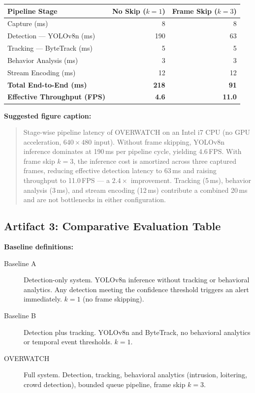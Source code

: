 \documentclass[11pt]{article}
\begin{document}
\begin{center}
\begin{tabular}{lrr}
\toprule
Pipeline Stage & No Skip ($k{=}1$) & Frame Skip ($k{=}3$) \\
\midrule
Capture (ms) & 8 & 8 \\
Detection --- YOLOv8n (ms) & 190 & 63 \\
Tracking --- ByteTrack (ms) & 5 & 5 \\
Behavior Analysis (ms) & 3 & 3 \\
Stream Encoding (ms) & 12 & 12 \\
\midrule
\textbf{Total End-to-End (ms)} & \textbf{218} & \textbf{91} \\
\textbf{Effective Throughput (FPS)} & \textbf{4.6} & \textbf{11.0} \\
\bottomrule
\end{tabular}
\end{center}

\textbf{Suggested figure caption:}

\begin{quote}
Stage-wise pipeline latency of OVERWATCH on an Intel i7 CPU (no GPU acceleration, $640 \times 480$ input). Without frame skipping, YOLOv8n inference dominates at 190\,ms per pipeline cycle, yielding 4.6\,FPS. With frame skip $k=3$, the inference cost is amortized across three captured frames, reducing effective detection latency to 63\,ms and raising throughput to 11.0\,FPS --- a $2.4\times$ improvement. Tracking (5\,ms), behavior analysis (3\,ms), and stream encoding (12\,ms) contribute a combined 20\,ms and are not bottlenecks in either configuration.
\end{quote}

\subsection{Artifact 3: Comparative Evaluation Table}

\textbf{Baseline definitions:}
\begin{description}
\item[Baseline A] Detection-only system. YOLOv8n inference without tracking or behavioral analytics. Any detection meeting the confidence threshold triggers an alert immediately. $k=1$ (no frame skipping).
\item[Baseline B] Detection plus tracking. YOLOv8n and ByteTrack, no behavioral analytics or temporal event thresholds. $k=1$.
\item[OVERWATCH] Full system. Detection, tracking, behavioral analytics (intrusion, loitering, crowd detection), bounded queue pipeline, frame skip $k=3$.
\end{description}
\end{document}
